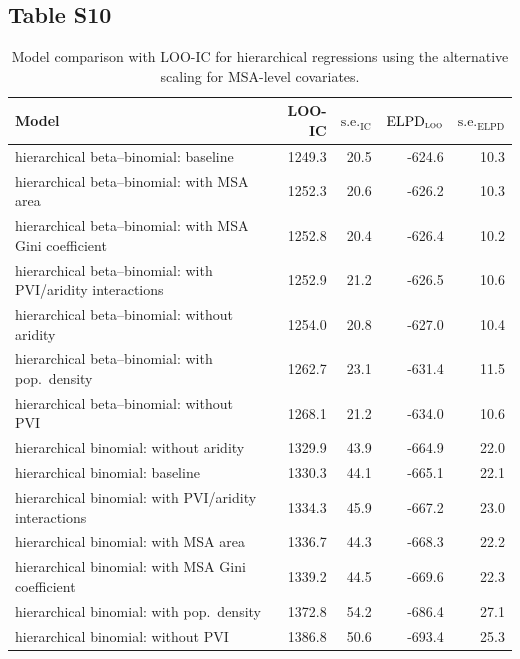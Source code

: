 \documentclass[draft]{agujournal}\usepackage{knitr}
\begin{document}
\subsection*{Table S10}
\begin{table}[H]
\centering
\begingroup\small
\begin{tabular}{p{3in}rrrr}
  \hline
Model & LOO-IC & $\text{s.e.}_{\text{IC}}$ & $\text{ELPD}_{\text{\scshape{loo}}}$ & $\text{s.e.}_{\text{ELPD}}$ \\ 
  \hline
hierarchical beta--binomial: baseline & 1249.3 & 20.5 & -624.6 & 10.3 \\ 
  hierarchical beta--binomial: with MSA area & 1252.3 & 20.6 & -626.2 & 10.3 \\ 
  hierarchical beta--binomial: with MSA Gini coefficient & 1252.8 & 20.4 & -626.4 & 10.2 \\ 
  hierarchical beta--binomial: with PVI/aridity interactions & 1252.9 & 21.2 & -626.5 & 10.6 \\ 
  hierarchical beta--binomial: without aridity & 1254.0 & 20.8 & -627.0 & 10.4 \\ 
  hierarchical beta--binomial: with pop.\ density & 1262.7 & 23.1 & -631.4 & 11.5 \\ 
  hierarchical beta--binomial: without PVI & 1268.1 & 21.2 & -634.0 & 10.6 \\ 
  hierarchical binomial: without aridity & 1329.9 & 43.9 & -664.9 & 22.0 \\ 
  hierarchical binomial: baseline & 1330.3 & 44.1 & -665.1 & 22.1 \\ 
  hierarchical binomial: with PVI/aridity interactions & 1334.3 & 45.9 & -667.2 & 23.0 \\ 
  hierarchical binomial: with MSA area & 1336.7 & 44.3 & -668.3 & 22.2 \\ 
  hierarchical binomial: with MSA Gini coefficient & 1339.2 & 44.5 & -669.6 & 22.3 \\ 
  hierarchical binomial: with pop.\ density & 1372.8 & 54.2 & -686.4 & 27.1 \\ 
  hierarchical binomial: without PVI & 1386.8 & 50.6 & -693.4 & 25.3 \\ 
   \hline
\end{tabular}
\endgroup
\caption[Model comparison: LOO (alternate covariates using alternative scaling) for hierarchical regressions.]{Model comparison with LOO-IC for hierarchical regressions using the alternative scaling for MSA-level covariates.} 
\label{tab:loo.vars}
\end{table}
\end{document}

